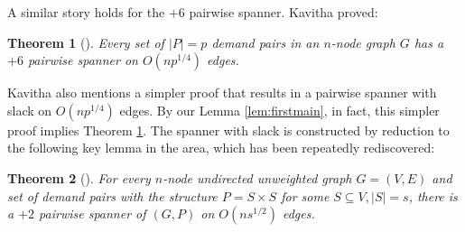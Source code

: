 \documentclass{article}
\newtheorem{theorem}{Theorem}
\begin{document}
A similar story holds for the $+6$ pairwise spanner.
Kavitha \cite{Kavitha17} proved:
\begin{theorem} [\cite{Kavitha17}] \label{thm:sixspan}
Every set of $|P| = p$ demand pairs in an $n$-node graph $G$ has a $+6$ pairwise spanner on $O(np^{1/4})$ edges.
\end{theorem}

Kavitha also mentions a simpler proof that results in a pairwise spanner with slack on $O(np^{1/4})$ edges.
By our Lemma \ref{lem:firstmain}, in fact, this simpler proof implies Theorem \ref{thm:sixspan}.
The spanner with slack is constructed by reduction to the following key lemma in the area, which has been repeatedly rediscovered:
\begin{theorem} [\cite{BKMP10, Pettie09, ElkinUnpub, CGK13}] \label{thm:2subspan}
For every $n$-node undirected unweighted graph $G = (V, E)$ and set of demand pairs with the structure $P = S \times S$ for some $S \subseteq V, |S| = s$, there is a $+2$ pairwise spanner of $(G, P)$ on $O(ns^{1/2})$ edges.
\end{theorem}
\end{document}
